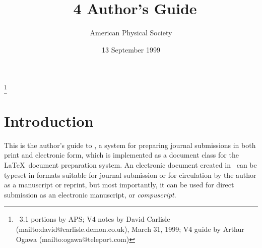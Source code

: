 \documentclass[%
prl%
,twocolumngrid%
,secnumarabic%
,amssymb]{revtex4}
\begin{document}
\title{\revtex~4 Author's Guide}%

\author{American Physical Society}%
\thanks{%
  \revtex~3.1 portions by APS;
  V4 notes by David Carlisle (mailto:david@carlisle.demon.co.uk), March 31, 1999;
  V4 guide by Arthur Ogawa (mailto:ogawa@teleport.com)
}%
\date{13 September 1999}%
\maketitle
\tableofcontents

\section{Introduction}

This is the author's guide to \revtex,
a system for preparing journal submissions in both print and electronic form,
which is implemented as a document class for the \LaTeX\ document preparation system.
An electronic document created in \revtex\ can be 
typeset in formats suitable for journal submission
or for circulation by the author as a manuscript or reprint,
but most importantly,
it can be used for direct submission as an electronic manuscript, or \emph{compuscript}.
\end{document}
